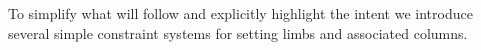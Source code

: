 To simplify what will follow and explicitly highlight the intent we introduce several simple
constraint systems for setting limbs and associated columns.
